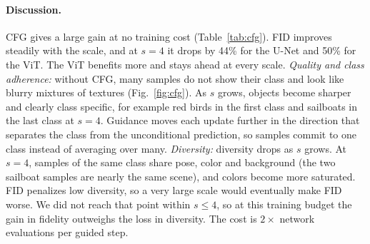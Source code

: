 \documentclass[11pt]{article}
\begin{document}
\paragraph{Discussion.} CFG gives a large gain at no training cost (Table~\ref{tab:cfg}). FID improves steadily with the scale, and at $s=4$ it drops by 44\% for the U-Net and 50\% for the ViT. The ViT benefits more and stays ahead at every scale.
\emph{Quality and class adherence:} without CFG, many samples do not show their class and look like blurry mixtures of textures (Fig.~\ref{fig:cfg}). As $s$ grows, objects become sharper and clearly class specific, for example red birds in the first class and sailboats in the last class at $s=4$. Guidance moves each update further in the direction that separates the class from the unconditional prediction, so samples commit to one class instead of averaging over many.
\emph{Diversity:} diversity drops as $s$ grows. At $s=4$, samples of the same class share pose, color and background (the two sailboat samples are nearly the same scene), and colors become more saturated. FID penalizes low diversity, so a very large scale would eventually make FID worse. We did not reach that point within $s\le4$, so at this training budget the gain in fidelity outweighs the loss in diversity. The cost is $2\times$ network evaluations per guided step.
\end{document}
